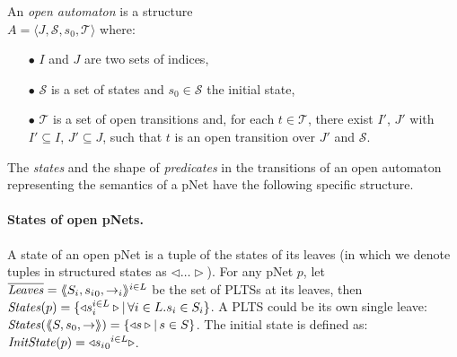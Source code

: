 \documentclass[smallcondensed]{svjour3}
\begin{document}
\begin{definition}
	\label{def:open-automaton}
	An \emph{open automaton} is a structure\\ $A =
	\langle J,\mathcal{S},s_0,\mathcal{T}\rangle$ where:
	\begin{itemize}
		\item[$\bullet$]  $I$ and $J$ are  two sets of indices,
		\item[$\bullet$]  $\mathcal{S}$ is a set of states and $s_0 \in \mathcal{S}$ the initial state,
		\item[$\bullet$] $\mathcal{T}$ is a set of open transitions and, for each
		$t\in \mathcal{T}$, there exist $I'$, $J'$ with $I'\subseteq I$, $J'
		\subseteq J$, such that $t$ is an open transition over $J'$
		and  $\mathcal{S}$.
		
	\end{itemize}
\end{definition}
%

The \emph{states} and the shape of \emph{predicates} in the
transitions
of an open automaton representing the semantics of a pNet
have the following specific structure.

\paragraph{States of open pNets.}\label{def-states}
A state of an open pNet is a tuple of the
states of its leaves (in which we denote tuples
in structured states as $\triangleleft\ldots\triangleright$).
For any pNet $p$, let $\overline{\mathit{Leaves}} = \langle\hspace{-0.58ex}\langle S_i,{s_i}_0, \to_i\rangle\hspace{-0.58ex}\rangle^{i \in L}$ be the set of PLTSs at its leaves,
then $\mathit{States}(p) = \{\triangleleft{s_i^{i\in L}}\triangleright
|\, \forall i\in L. s_i \in S_i\}$.
A PLTS could be its own single leave:
$\mathit{States}(\langle\hspace{-0.58ex}\langle S,s_0, \to\rangle\hspace{-0.58ex}\rangle) = \{\triangleleft{s}\triangleright|\, s \in S\}$.
The initial state is defined as:
$\mathit{InitState}(p) = \triangleleft{{{s_i}_0}^{i\in L}}\triangleright$.


\end{document}
